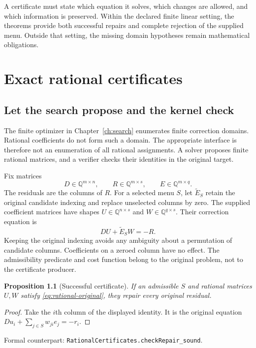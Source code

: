 \documentclass[11pt,letterpaper,oneside,openany]{book}
\theoremstyle{quiet}
\newtheorem{proposition}[theorem]{Proposition}
\newcommand{\Q}{\mathbb{Q}}
\newcommand{\formal}[1]{\par\nobreak\begingroup\footnotesize\color{Slate}\sffamily Formal counterpart: \normalfont\nolinkurl{#1}.\par\endgroup}
\begin{document}
\begin{scopebox}[title=A usable stopping point]
A certificate must state which equation it solves, which changes are allowed, and which information is preserved. Within the declared finite linear setting, the theorems provide both successful repairs and complete rejection of the supplied menu. Outside that setting, the missing domain hypotheses remain mathematical obligations.
\end{scopebox}

\chapter{Exact rational certificates}\label{ch:rational}
\section{Let the search propose and the kernel check}
The finite optimizer in Chapter~\ref{ch:search} enumerates finite correction domains. Rational coefficients do not form such a domain. The appropriate interface is therefore not an enumeration of all rational assignments. A solver proposes finite rational matrices, and a verifier checks their identities in the original target.

Fix matrices
\[
 D\in\Q^{m\times n},\qquad R\in\Q^{m\times s},\qquad E\in\Q^{m\times q}.
\]
The residuals are the columns of $R$. For a selected menu $S$, let $\widetilde E_S$ retain the original candidate indexing and replace unselected columns by zero. The supplied coefficient matrices have shapes $U\in\Q^{n\times s}$ and $W\in\Q^{q\times s}$. Their correction equation is
\begin{equation}\label{eq:rational-original}
 DU+\widetilde E_SW=-R.
\end{equation}
Keeping the original indexing avoids any ambiguity about a permutation of candidate columns. Coefficients on a zeroed column have no effect. The admissibility predicate and cost function belong to the original problem, not to the certificate producer.

\begin{proposition}[Successful certificate]\label{prop:rational-success}
If an admissible $S$ and rational matrices $U,W$ satisfy \eqref{eq:rational-original}, they repair every original residual.
\end{proposition}
\begin{proof}
Take the $i$th column of the displayed identity. It is the original equation $Du_i+\sum_{j\in S}w_{ji}e_j=-r_i$.
\end{proof}
\formal{RationalCertificates.checkRepair_sound}
\end{document}
